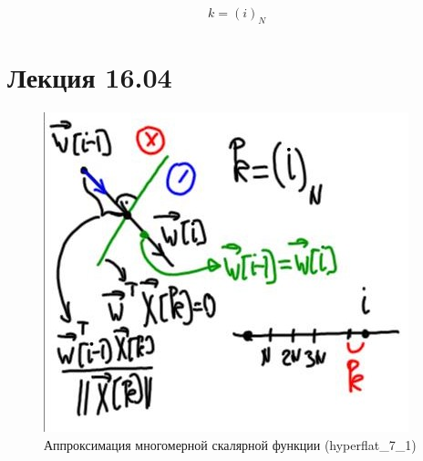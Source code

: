\documentclass[a4paper]{article}
\numberwithin{equation}{subsection}
\begin{document}
\begin{equation*}
    k = (i)_N
\end{equation*}



\newpage
\section{Лекция 16.04}








\begin{figure}[H]
    \centering
    \includegraphics[height=8 cm]{hyperflat_7_1.jpeg}
    \caption{Аппроксимация многомерной скалярной функции (hyperflat\_7\_1)}
    \label{hyperflat_7_1}
\end{figure}
\end{document}
